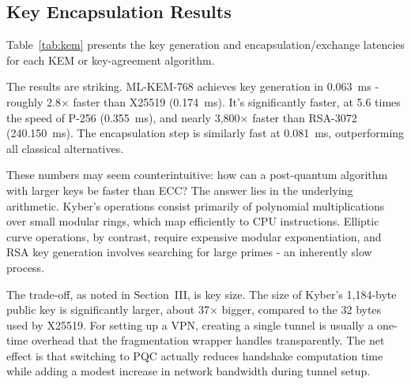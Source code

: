 \documentclass[10pt, conference, letterpaper]{IEEEtran}
\begin{document}
\subsection{Key Encapsulation Results}
Table~\ref{tab:kem} presents the key generation and encapsulation/exchange latencies for each KEM or key-agreement algorithm.

\begin{table}[hbt!]
\centering
\caption{KEM / Key Exchange Performance (mean of 25 iterations)}
\label{tab:kem}
\end{table}

The results are striking. ML-KEM-768 achieves key generation in 0.063~ms - roughly 2.8$\times$ faster than X25519 (0.174~ms). It's significantly faster, at 5.6 times the speed of P-256 (0.355~ms), and nearly 3,800$\times$ faster than RSA-3072 (240.150~ms). The encapsulation step is similarly fast at 0.081~ms, outperforming all classical alternatives.

These numbers may seem counterintuitive: how can a post-quantum algorithm with larger keys be faster than ECC? The answer lies in the underlying arithmetic. Kyber's operations consist primarily of polynomial multiplications over small modular rings, which map efficiently to CPU instructions. Elliptic curve operations, by contrast, require expensive modular exponentiation, and RSA key generation involves searching for large primes - an inherently slow process.

The trade-off, as noted in Section~III, is key size. The size of Kyber's 1,184-byte public key is significantly larger, about 37$\times$ bigger, compared to the 32 bytes used by X25519. For setting up a VPN, creating a single tunnel is usually a one-time overhead that the fragmentation wrapper handles transparently. The net effect is that switching to PQC actually reduces handshake computation time while adding a modest increase in network bandwidth during tunnel setup.
\end{document}

